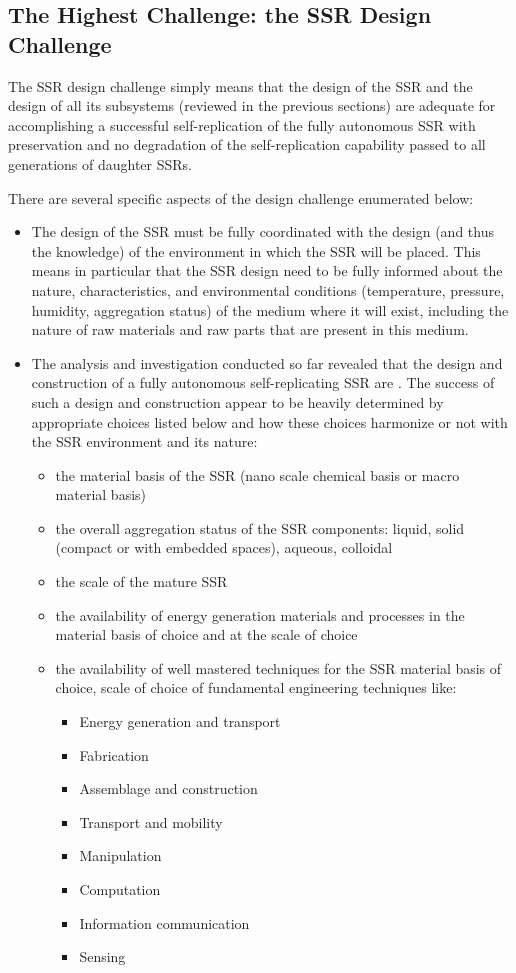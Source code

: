 \subsection[The Highest Challenge: the SSR Design Challenge]{The Highest
Challenge: the SSR Design Challenge}

The SSR design challenge simply
means that the design of the SSR and the design of all its subsystems
(reviewed in the previous sections) are adequate for accomplishing a
successful self-replication of the fully autonomous SSR with
preservation and no degradation of the self-replication capability
passed to all generations of daughter SSRs.

There are several specific aspects of the design challenge enumerated
below:

\begin{itemize}
\item The design of the SSR must be fully coordinated with the design
(and thus the knowledge) of the environment in which the SSR will be
placed. This means in particular that the SSR design need to be fully
informed about the nature, characteristics, and environmental conditions
(temperature, pressure, humidity, aggregation status) of the medium
where it will exist, including the nature of raw materials and raw
parts that are present in this medium.
\item The analysis and investigation conducted so far revealed that the
design and construction of a fully autonomous self-replicating SSR are
. The success of such a design and
construction appear to be heavily determined by appropriate choices
listed below and how these choices harmonize or not with the SSR
environment and its nature:

\begin{itemize}
\item the material basis of the SSR (nano scale chemical basis or macro material basis)
\item the overall aggregation status of the SSR components: liquid,
solid (compact or with embedded spaces), aqueous, colloidal
\item the scale of the mature SSR 
\item the availability of energy generation materials and processes in
the material basis of choice and at the scale of choice
\item the availability of well mastered techniques for the SSR material
basis of choice, scale of choice of fundamental engineering techniques
like:

\begin{itemize}
\item Energy generation and transport
\item Fabrication
\item Assemblage and construction
\item Transport and mobility
\item Manipulation
\item Computation
\item Information communication
\item Sensing
\end{itemize}
\end{itemize}
\end{itemize}
